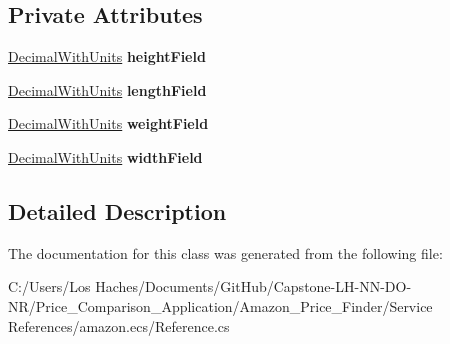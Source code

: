 \subsection*{Private Attributes}
\begin{DoxyCompactItemize}
\item 
\hypertarget{class_price___comparison_1_1amazon_1_1ecs_1_1_item_attributes_item_dimensions_a6544f5d73ae6d2d5e882f3a6e71ecc5d}{\hyperlink{class_price___comparison_1_1amazon_1_1ecs_1_1_decimal_with_units}{Decimal\-With\-Units} {\bfseries height\-Field}}\label{class_price___comparison_1_1amazon_1_1ecs_1_1_item_attributes_item_dimensions_a6544f5d73ae6d2d5e882f3a6e71ecc5d}

\item 
\hypertarget{class_price___comparison_1_1amazon_1_1ecs_1_1_item_attributes_item_dimensions_a88a8efc9a6bf86113bb6db87b89b3702}{\hyperlink{class_price___comparison_1_1amazon_1_1ecs_1_1_decimal_with_units}{Decimal\-With\-Units} {\bfseries length\-Field}}\label{class_price___comparison_1_1amazon_1_1ecs_1_1_item_attributes_item_dimensions_a88a8efc9a6bf86113bb6db87b89b3702}

\item 
\hypertarget{class_price___comparison_1_1amazon_1_1ecs_1_1_item_attributes_item_dimensions_a0958f7690bf63453541de3fa0dc953a0}{\hyperlink{class_price___comparison_1_1amazon_1_1ecs_1_1_decimal_with_units}{Decimal\-With\-Units} {\bfseries weight\-Field}}\label{class_price___comparison_1_1amazon_1_1ecs_1_1_item_attributes_item_dimensions_a0958f7690bf63453541de3fa0dc953a0}

\item 
\hypertarget{class_price___comparison_1_1amazon_1_1ecs_1_1_item_attributes_item_dimensions_adc76c71d1974bdfda5bd990c191a594e}{\hyperlink{class_price___comparison_1_1amazon_1_1ecs_1_1_decimal_with_units}{Decimal\-With\-Units} {\bfseries width\-Field}}\label{class_price___comparison_1_1amazon_1_1ecs_1_1_item_attributes_item_dimensions_adc76c71d1974bdfda5bd990c191a594e}

\end{DoxyCompactItemize}


\subsection{Detailed Description}


The documentation for this class was generated from the following file\-:\begin{DoxyCompactItemize}
\item 
C\-:/\-Users/\-Los Haches/\-Documents/\-Git\-Hub/\-Capstone-\/\-L\-H-\/\-N\-N-\/\-D\-O-\/\-N\-R/\-Price\-\_\-\-Comparison\-\_\-\-Application/\-Amazon\-\_\-\-Price\-\_\-\-Finder/\-Service References/amazon.\-ecs/Reference.\-cs\end{DoxyCompactItemize}
